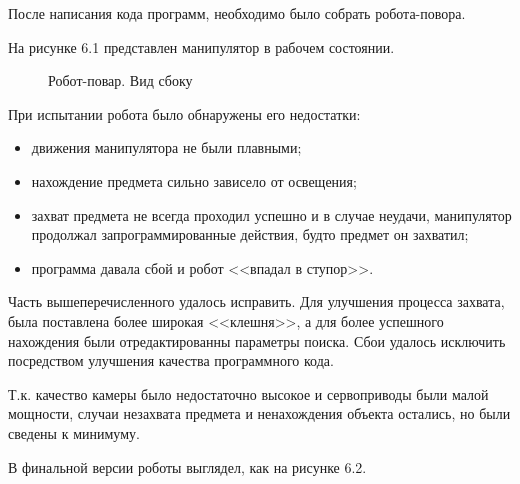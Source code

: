 После написания кода программ, необходимо было собрать робота-повора.

На рисунке 6.1 представлен манипулятор в рабочем состоянии.

\begin{figure}[h!]
\caption{Робот-повар. Вид сбоку}
\end{figure}

При испытании робота было обнаружены его недостатки:

\begin{itemize}
   	\item движения манипулятора не были плавными;
   	\item нахождение предмета сильно зависело от освещения;
   	\item захват предмета не всегда проходил успешно и в случае неудачи, манипулятор продолжал запрограммированные действия, будто предмет он захватил;
   	\item программа давала сбой и робот <<впадал в ступор>>.
\end{itemize}

Часть вышеперечисленного удалось исправить. Для улучшения процесса захвата, была поставлена более широкая <<клешня>>, а для более успешного нахождения были отредактированны параметры поиска. Сбои удалось исключить посредством улучшения качества программного кода.

Т.к. качество камеры было недостаточно высокое и сервоприводы были малой мощности, случаи незахвата предмета и ненахождения объекта остались, но были сведены к минимуму.

В финальной версии роботы выглядел, как на рисунке 6.2.

